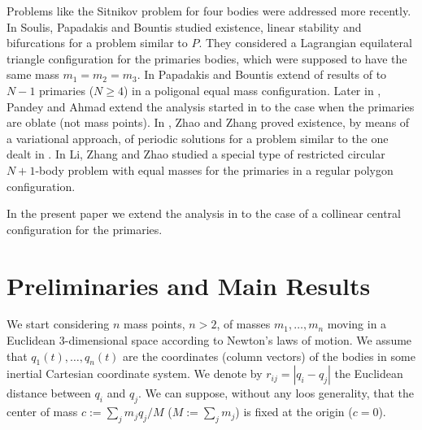 \documentclass[twoside]{article}
\theoremstyle{remark}
\begin{document}
Problems like the Sitnikov problem for four bodies  were addressed more recently.
In \cite{soulis2008periodic} Soulis, Papadakis and Bountis studied existence, linear stability and bifurcations for a problem similar to $P$. They considered  a Lagrangian equilateral triangle configuration for the primaries bodies, which were supposed to have the same mass $m_1=m_2=m_3$. In \cite{bountis2009stability} Papadakis and Bountis extend of results of \cite{soulis2008periodic} to $N-1$ primaries ($N\geq 4$) in a poligonal equal mass configuration. Later  in \cite{pandey2013periodic}, Pandey and Ahmad extend the analysis started in \cite{soulis2008periodic} to the case when the primaries are oblate (not mass points).
In \cite{zhao2015nonplanar}, Zhao and Zhang proved existence, by means of a variational approach, of periodic solutions for a problem similar to the one dealt in \cite{soulis2008periodic}.
In \cite{li2013characterization} Li, Zhang and Zhao studied a special type of
restricted circular $N+1$-body problem  with equal masses for the primaries in a regular polygon configuration.

In the present paper we extend the analysis in \cite{zhao2015nonplanar} to the case of a collinear central configuration for the primaries.





\section{Preliminaries and Main Results}

We start considering $n$  mass points, $n>2$, of masses $m_1,\ldots,m_n$ moving in a Euclidean 3-dimensional space according to Newton's laws of motion. We assume that $q_1(t),\ldots,q_n(t)$ are the coordinates (column vectors) of the bodies in some inertial Cartesian coordinate system. We denote by $r_{ij}=|q_i-q_j|$  the  Euclidean distance between $q_i$ and $q_j$. We can suppose, without any loos generality, that the center of mass   $c:=\sum_jm_jq_j/M$ ($M:=\sum_j m_j$) is fixed at the origin ($c=0$).
\end{document}
